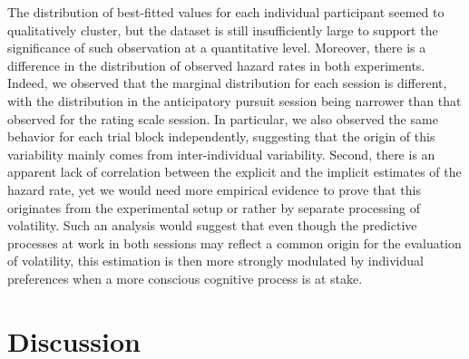 \documentclass[10pt,letterpaper]{article}
\begin{document}
The distribution of best-fitted values for each individual participant seemed to qualitatively cluster,
but the dataset is still insufficiently large to support the significance of such observation
at a quantitative level.
Moreover, there is a difference in the distribution of observed hazard rates in both experiments.
Indeed, we observed that the marginal distribution for each session is different,
with the distribution in the anticipatory pursuit session being narrower than
that observed for the rating scale session.
In particular, we also observed the same behavior for each trial block independently,
suggesting that the origin of this variability mainly comes from inter-individual variability.
Second, there is an apparent lack of correlation between the explicit and the implicit estimates of the hazard rate,
yet we would need more empirical evidence to prove
that this originates from the experimental setup or rather by separate processing of volatility.
Such an analysis would suggest that even though the predictive processes
at work in both sessions may reflect a common origin for the evaluation of volatility,
this estimation is then more strongly modulated by individual preferences
when a more conscious cognitive process is at stake.
\section{Discussion}
\label{sec:outro}
\end{document}
